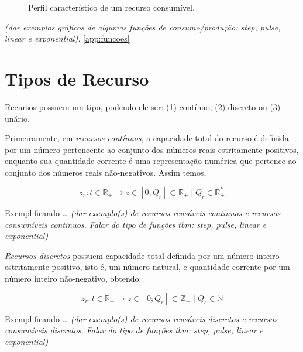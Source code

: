         \begin{figure}
            \centering
            
            \caption{Perfil característico de um recurso consumível.} \label{fig:recurso_consumivel}
        \end{figure}
        
        \emph{\color{red} (dar exemplos gráficos de algumas funções de consumo/produção: \textit{step}, \textit{pulse}, \textit{linear} e \textit{exponential}). } \ref{app:funcoes}
        
    
    \section{Tipos de Recurso} \label{sec:tipos_recurso}
    
        Recursos possuem um tipo, podendo ele ser: (1) contínuo, (2) discreto ou (3) unário. 
        
        Primeiramente, em \textit{recursos contínuos}, a capacidade total do recurso é definida por um número pertencente ao conjunto dos números reais estritamente positivos, enquanto sua quantidade corrente é uma representação numérica que pertence ao conjunto dos números reais não-negativos. Assim temos, 
        
        \begin{equation} \label{eq:recurso_continuo}
            z_r: t \in \mathbb{R}_+ \to z \in [0; Q_r] \subset \mathbb{R}_+ \mid Q_r \in \mathbb{R}_+^*
        \end{equation}
        
        Exemplificando \dots \emph{\color{red} (dar exemplo(s) de recursos reusáveis contínuos e recursos consumíveis contínuos. Falar do tipo de funções tbm: \textit{step}, \textit{pulse}, \textit{linear} e \textit{exponential})}
        
        \textit{Recursos discretos} possuem capacidade total definida por um número inteiro estritamente positivo, isto é, um número natural, e quantidade corrente por um número inteiro não-negativo, obtendo:
        
        \begin{equation} \label{eq:recurso_discreto}
            z_r: t \in \mathbb{R}_+ \to z \in [0; Q_r] \subset \mathbb{Z}_+ \mid Q_r \in \mathbb{N}
        \end{equation}
        
        Exemplificando \dots \emph{\color{red} (dar exemplo(s) de recursos reusáveis discretos e recursos consumíveis discretos. Falar do tipo de funções tbm: \textit{step}, \textit{pulse}, \textit{linear} e \textit{exponential})}
        
